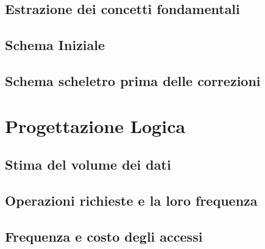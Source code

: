 \documentclass{article}
\begin{document}
\subsection{Estrazione dei concetti fondamentali}


\subsection{Schema Iniziale}



\subsection{Schema scheletro prima delle correzioni}



\section{Progettazione Logica}

\subsection{Stima del volume dei dati}


\subsection{Operazioni richieste e la loro frequenza}


% 

\subsection{Frequenza e costo degli accessi}
\end{document}
